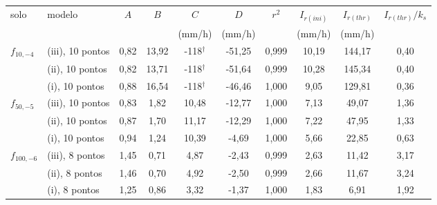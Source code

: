\begin{tabular}{ll|cccc|c|ccc}
\toprule
solo & modelo & $A$ & $B$ & $C$ & $D$ & $r^2$ & $I_{r(ini)}$ & $I_{r(thr)}$ & $I_{r(thr)}/k_s$\\
 & & & & (mm/h) & (mm/h) & & (mm/h) & (mm/h) & \\
\midrule
$f_{10,-4}$ & (iii), 10 pontos & 0{,}82 & 13{,}92 & -118$^\dagger$ & -51{,}25 & 0{,}999 & 10{,}19 & 144{,}17 & 0{,}40\\
 & (ii), 10 pontos & 0{,}82 & 13{,}71 & -118$^\dagger$ & -51{,}64 & 0{,}999 & 10{,}28 & 145{,}34 & 0{,}40\\
 & (i), 10 pontos & 0{,}88 & 16{,}54 & -118$^\dagger$ & -46{,}46 & 1{,}000 & 9{,}05 & 129{,}81 & 0{,}36\\
\midrule
$f_{50,-5}$ & (iii), 10 pontos & 0{,}83 & 1{,}82 & 10{,}48 & -12{,}77 & 1{,}000 & 7{,}13 & 49{,}07 & 1{,}36\\
 & (ii), 10 pontos & 0{,}87 & 1{,}70 & 11{,}17 & -12{,}29 & 1{,}000 & 7{,}22 & 47{,}95 & 1{,}33\\
 & (i), 10 pontos & 0{,}94 & 1{,}24 & 10{,}39 & -4{,}69 & 1{,}000 & 5{,}66 & 22{,}85 & 0{,}63\\
\midrule
$f_{100,-6}$ & (iii), 8 pontos & 1{,}45 & 0{,}71 & 4{,}87 & -2{,}43 & 0{,}999 & 2{,}63 & 11{,}42 & 3{,}17\\
 & (ii), 8 pontos & 1{,}46 & 0{,}70 & 4{,}92 & -2{,}50 & 0{,}999 & 2{,}66 & 11{,}67 & 3{,}24\\
 & (i), 8 pontos & 1{,}25 & 0{,}86 & 3{,}32 & -1{,}37 & 1{,}000 & 1{,}83 & 6{,}91 & 1{,}92\\
\bottomrule
\end{tabular}

